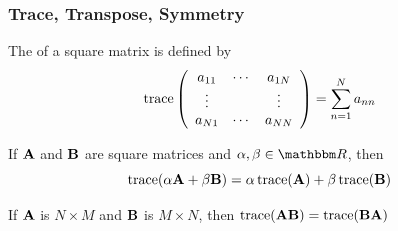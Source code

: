 \begin{frame}\frametitle{Trace, Transpose, Symmetry}
    
    The  of a square matrix is defined by 
    \vspace{0.5em}
    \begin{equation*}
        \operatorname{trace} \left(
        \begin{array}{ccc}
            a_{11} &  \cdots & a_{1N} \\
            \vdots & &  \vdots \\
            a_{N1} &  \cdots & a_{NN} \\
        \end{array}
        \right)
        = 
        \sum_{n=1}^N a_{nn}
    \end{equation*}

    \vspace{0.5em}

    \vspace{0.5em}

    \Fact{\eqref{ET-fa:lmpt}} If $\mathbf A$ and $\mathbf B$ are square matrices and
    $\alpha, \beta \in \RR$, then 
    \begin{equation*}
        \operatorname{trace}(\alpha \mathbf A + \beta \mathbf B) 
        = \alpha \operatorname{trace}(\mathbf A) + \beta \operatorname{trace}(\mathbf B)
    \end{equation*}

    \vspace{0.5em}
    If 
    $\mathbf A$ is $N \times M$ and $\mathbf B$ is $M \times N$, then 
    $\operatorname{trace}(\mathbf A \mathbf B) = \operatorname{trace}(\mathbf B \mathbf A)$

\end{frame}

